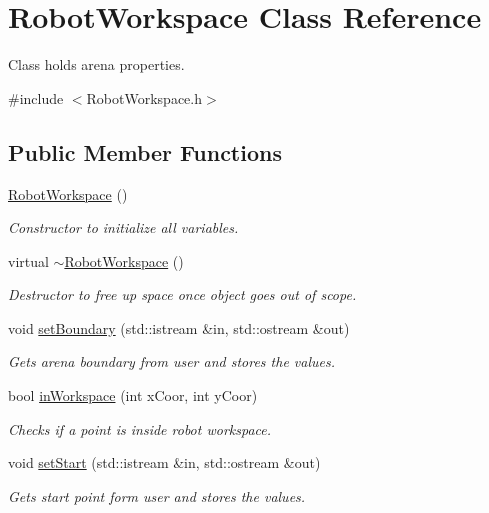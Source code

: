 \hypertarget{classRobotWorkspace}{}\section{Robot\+Workspace Class Reference}
\label{classRobotWorkspace}


Class holds arena properties.  




{\ttfamily \#include $<$Robot\+Workspace.\+h$>$}

\subsection*{Public Member Functions}
\begin{DoxyCompactItemize}
\item 
\hyperlink{classRobotWorkspace_a8f7a524b49e8aa02ffb09217121ceb48}{Robot\+Workspace} ()
\begin{DoxyCompactList}\small\item\em Constructor to initialize all variables. \end{DoxyCompactList}\item 
virtual \hyperlink{classRobotWorkspace_a12d3f046d8da00e2deb6993e2f8ed6d6}{$\sim$\+Robot\+Workspace} ()
\begin{DoxyCompactList}\small\item\em Destructor to free up space once object goes out of scope. \end{DoxyCompactList}\item 
void \hyperlink{classRobotWorkspace_a71629540fde21950191bb65b1347091a}{set\+Boundary} (std\+::istream \&in, std\+::ostream \&out)
\begin{DoxyCompactList}\small\item\em Gets arena boundary from user and stores the values. \end{DoxyCompactList}\item 
bool \hyperlink{classRobotWorkspace_a5aab3406ebbe715fe246765e7c720182}{in\+Workspace} (int x\+Coor, int y\+Coor)
\begin{DoxyCompactList}\small\item\em Checks if a point is inside robot workspace. \end{DoxyCompactList}\item 
void \hyperlink{classRobotWorkspace_ae82483686909445a92591229a979d059}{set\+Start} (std\+::istream \&in, std\+::ostream \&out)
\begin{DoxyCompactList}\small\item\em Gets start point form user and stores the values. \end{DoxyCompactList}\item 

\end{DoxyCompactItemize}
